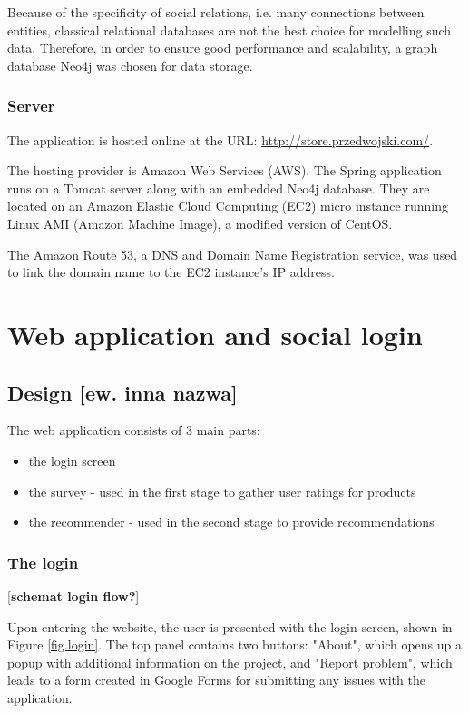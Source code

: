 \documentclass[12pt]{report}
\begin{document}
Because of the specificity of social relations, i.e. many connections between entities, classical relational databases are not the best choice for modelling such data. Therefore, in order to ensure good performance and scalability, a graph database Neo4j \cite{neo4j} was chosen for data storage.

\subsubsection{Server}

The application is hosted online at the URL: \url{http://store.przedwojski.com/}. 

The hosting provider is Amazon Web Services (AWS). The Spring application runs on a Tomcat server along with an embedded Neo4j database. They are located on an Amazon Elastic Cloud Computing (EC2) micro instance running Linux AMI (Amazon Machine Image), a modified version of CentOS.

The Amazon Route 53, a DNS and Domain Name Registration service, was used to link the domain name to the EC2 instance's IP address.

\section{Web application and social login}
\subsection{Design [ew. inna nazwa]}

The web application consists of 3 main parts:
\begin{itemize}
\item the login screen
\item the survey - used in the first stage to gather user ratings for products
\item the recommender - used in the second stage to provide recommendations
\end{itemize}

\subsubsection{The login}
[{\bf schemat login flow?}]

Upon entering the website, the user is presented with the login screen, shown in Figure \ref{fig.login}. The top panel contains two buttons: "About", which opens up a popup with additional information on the project, and "Report problem", which leads to a form created in Google Forms for submitting any issues with the application.
\end{document}
